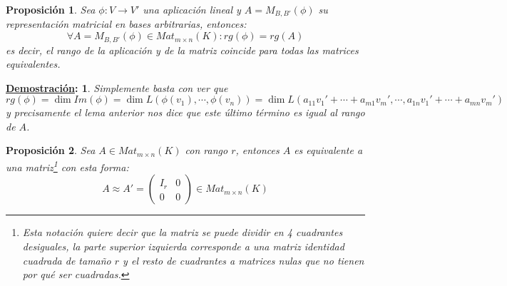 \documentclass[10pt,a4paper,openright]{book}
\theoremstyle{break}
\newtheorem*{prop}{Proposición}
\newtheorem*{demo}{\underline{Demostración}:}
\begin{document}
\begin{prop}
Sea $\phi: V\rightarrow V'$ una aplicación lineal y $A = M_{B,B'}(\phi)$ su representación matricial en bases arbitrarias, entonces:
$$
\forall A = M_{B,B'}(\phi) \in  Mat_{m\times n}(K) :  rg(\phi)=rg(A)
$$
es decir, el rango de la aplicación y de la matriz coincide para todas las matrices equivalentes.
\end{prop}
\begin{demo}
Simplemente basta con ver que
$$
rg(\phi)=\dim Im(\phi)=\dim L(\phi(v_1), \cdots, \phi(v_n))=\dim L(a_{11}v_1'+\cdots + a_{m1}v_m', \cdots , a_{1n}v_1'+\cdots +a_{mn}v_m')
$$
y precisamente el lema anterior nos dice que este último término es igual al rango de $A$.
\end{demo}

\begin{prop}
Sea $A\in Mat_{m\times n}(K)$ con rango $r$, entonces $A$ es equivalente a una matriz\footnote{Esta notación quiere decir que la matriz se puede dividir en 4 cuadrantes desiguales, la parte superior izquierda corresponde a una matriz identidad cuadrada de tamaño $r$ y el resto de cuadrantes a matrices nulas que no tienen por qué ser cuadradas.} con esta forma:
$$
A\approx A'=\left(\begin{array}{c|c} I_r & 0  \\ \hline 0 & 0 \end{array}\right) \in Mat_{m\times n}(K)
$$
\end{prop}
\end{document}
